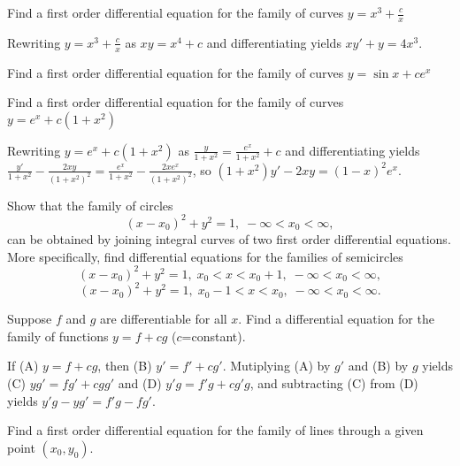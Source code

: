 \documentclass{ximera}
\begin{document}
 \begin{problem}\label{exer:4.5.6} Find a first order
differential equation for the family of curves 
 $y=x^3+\frac{c}{x}$

\begin{solution}
Rewriting $y=x^3+\frac{c}{x}$ as $xy=x^4+c$ and differentiating
yields $xy'+y=4x^3$.
\end{solution}
\end{problem}

\begin{problem}\label{exer:4.5.7} Find a first order
differential equation for the family of curves 
 $y=\sin x+ce^x$
\end{problem}

\begin{problem}\label{exer:4.5.8} Find a first order
differential equation for the family of curves 
 $y=e^x+c(1+x^2)$

\begin{solution}
Rewriting $y=e^x+c(1+x^2)$ as
$\frac{y}{1+x^2}=\frac{e^x}{1+x^2}+c$ and differentiating yields
$\frac{y'}{1+x^2}-\frac{2xy}{(1+x^2)^2}=
\frac{e^x}{1+x^2}-\frac{2xe^x}{(1+x^2)^2}$, so
$(1+x^2)y'-2xy=(1-x)^2e^x$.
\end{solution}
\end{problem}

\begin{problem}\label{exer:4.5.9}
Show that the family of circles
$$
(x-x_0)^2+y^2=1,\;-\infty<x_0<\infty,
$$
can be obtained by joining integral curves of two first order
differential equations. More specifically, find differential equations
for the families of semicircles
$$
(x-x_0)^2+y^2=1,\; x_0<x<x_0+1,\;-\infty<x_0<\infty,
$$
$$
(x-x_0)^2+y^2=1,\; x_0-1<x<x_0,\;-\infty<x_0<\infty.
$$
\end{problem}

\begin{problem}\label{exer:4.5.10}
Suppose $f$ and $g$ are differentiable for all $x$. Find a
differential equation for the family of functions $y=f+cg$
($c$=constant).

\begin{solution}
If (A) $y=f+cg$, then (B) $y'=f'+cg'$. Mutiplying (A) by $g'$
and (B) by $g$ yields
(C) $yg'=fg'+cgg'$ and  (D) $y'g=f'g+cg'g$, and subtracting (C)
from (D) yields
$y'g-yg'=f'g-fg'$.
\end{solution}
\end{problem}

\begin{problem}\label{exer:4.5.11}
Find a
first order differential equation for the family of lines through a given point $(x_0,y_0)$.
\end{problem}
\end{document}
